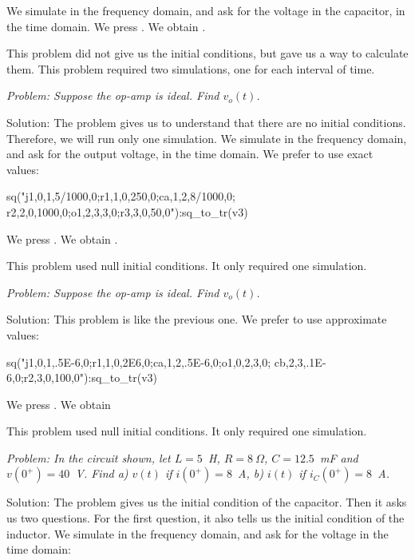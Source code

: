 We simulate in the frequency domain, and ask for the voltage in the
capacitor, in the time domain. We press . We obtain
.

This problem did not give us the initial conditions, but gave us a
way to calculate them. This problem required two simulations, one
for each interval of time.


\emph{Problem: Suppose the op-amp is ideal. Find $v_o(t)$.}

Solution: The problem gives us to understand that there are no
initial conditions. Therefore, we will run only one simulation. We
simulate in the frequency domain, and ask for the output voltage, in
the time domain. We prefer to use exact values:

\begin{entry}
sq\fd("j1,0,1,5/1000,0;r1,1,0,250,0;ca,1,2,8/1000,0;
      r2,2,0,1000,0;o1,2,3,3,0;r3,3,0,50,0"):sq\fd_to_tr(v3)
\end{entry}

We press . We obtain .

This problem used null initial conditions. It only required one
simulation.


\emph{Problem: Suppose the op-amp is ideal. Find $v_o(t)$.}

Solution: This problem is like the previous one. We prefer to use
approximate values:

\begin{entry}
sq\fd("j1,0,1,.5E-6,0;r1,1,0,2E6,0;ca,1,2,.5E-6,0;o1,0,2,3,0;
      cb,2,3,.1E-6,0;r2,3,0,100,0"):sq\fd_to_tr(v3)
\end{entry}

We press . We obtain 

This problem used null initial conditions. It only required one
simulation.


\emph{Problem: In the circuit shown, let $L = 5$~H,
$R = 8~\Omega$, $C = 12.5$~mF and $v(0^{+}) = 40$~V. Find a) $v(t)$
if $i(0^{+}) = 8$~A, b) $i(t)$ if $i_C(0^{+}) = 8$~A.}

Solution: The problem gives us the initial condition of the
capacitor. Then it asks us two questions. For the first question, it
also tells us the initial condition of the inductor. We simulate in
the frequency domain, and ask for the voltage in the time domain:

